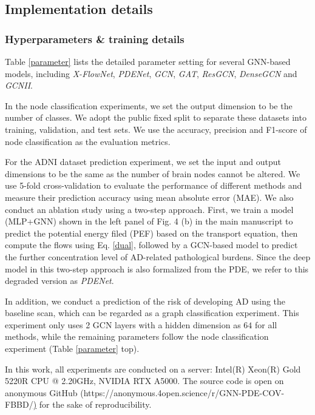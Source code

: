\documentclass{article}
\begin{document}
\subsection{Implementation details}

\subsubsection{Hyperparameters \& training details}
\label{hyperpa}
Table \ref{parameter} lists the detailed parameter setting for several GNN-based models, including \textit{X-FlowNet}, \textit{PDENet},  \textit{GCN}, \textit{GAT}, \textit{ResGCN}, \textit{DenseGCN} and \textit{GCNII}.

In the node classification experiments, we set the output dimension to be the number of classes. We adopt the public fixed split \cite{yang2016revisiting} to separate these datasets into training, validation, and test sets. We use the accuracy, precision and F1-score of node classification as the evaluation metrics.

For the ADNI dataset prediction experiment, we set the input and output dimensions to be the same as the number of brain nodes cannot be altered. We use 5-fold cross-validation to evaluate the performance of different methods and measure their prediction accuracy using mean absolute error (MAE). We also conduct an ablation study using a two-step approach. First, we train a model (MLP+GNN) shown in the left panel of Fig. 4 (b) in the main manuscript to predict the potential energy filed (PEF) based on the transport equation, then compute the flows using Eq. \ref{dual}, followed by a GCN-based model to predict the further concentration level of AD-related pathological burdens. Since the deep model in this two-step approach is also formalized from the PDE, we refer to this degraded version as \textit{PDENet}.

In addition, we conduct a prediction of the risk of developing AD using the baseline scan, which can be regarded as a graph classification experiment. This experiment only uses 2 GCN layers with a hidden dimension as $64$ for all methods, while the remaining parameters follow the node classification experiment (Table \ref{parameter} top).

In this work, all experiments are conducted on a server: Intel(R) Xeon(R) Gold 5220R CPU @ 2.20GHz, NVIDIA RTX A5000. The source code is open on anonymous GitHub (https://anonymous.4open.science/r/GNN-PDE-COV-FBBD/\href{https://anonymous.4open.science/r/GNN-PDE-COV-FBBD/}) for the sake of reproducibility.
\end{document}

